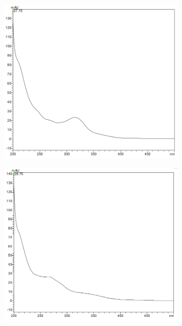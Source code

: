 \begin{figure}[!htbp]
  \begin{subfigure}[b]{0.5\textwidth}
    \includegraphics[width=\textwidth]{figures/Kapitel6/keineReaktion/NCC2725.png}
    \caption{}
    \label{fig:NCC2725}
  \end{subfigure}
  \hfill
  \begin{subfigure}[b]{0.5\textwidth}
    \includegraphics[width=\textwidth]{figures/Kapitel6/keineReaktion/DNCC2991.png}
    \caption{}
    \label{fig:DNCC2991}
  \end{subfigure}
  

\end{figure}
